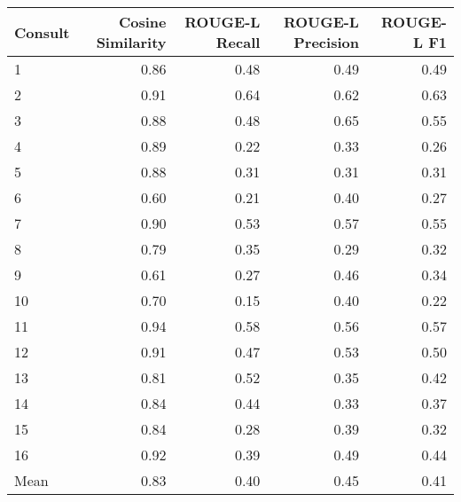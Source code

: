 \begin{tabular}{lrrrr}
\toprule
Consult & Cosine Similarity & ROUGE-L Recall & ROUGE-L Precision & ROUGE-L F1 \\
\midrule
1 & 0.86 & 0.48 & 0.49 & 0.49 \\
2 & 0.91 & 0.64 & 0.62 & 0.63 \\
3 & 0.88 & 0.48 & 0.65 & 0.55 \\
4 & 0.89 & 0.22 & 0.33 & 0.26 \\
5 & 0.88 & 0.31 & 0.31 & 0.31 \\
6 & 0.60 & 0.21 & 0.40 & 0.27 \\
7 & 0.90 & 0.53 & 0.57 & 0.55 \\
8 & 0.79 & 0.35 & 0.29 & 0.32 \\
9 & 0.61 & 0.27 & 0.46 & 0.34 \\
10 & 0.70 & 0.15 & 0.40 & 0.22 \\
11 & 0.94 & 0.58 & 0.56 & 0.57 \\
12 & 0.91 & 0.47 & 0.53 & 0.50 \\
13 & 0.81 & 0.52 & 0.35 & 0.42 \\
14 & 0.84 & 0.44 & 0.33 & 0.37 \\
15 & 0.84 & 0.28 & 0.39 & 0.32 \\
16 & 0.92 & 0.39 & 0.49 & 0.44 \\
Mean & 0.83 & 0.40 & 0.45 & 0.41 \\
\bottomrule
\end{tabular}
